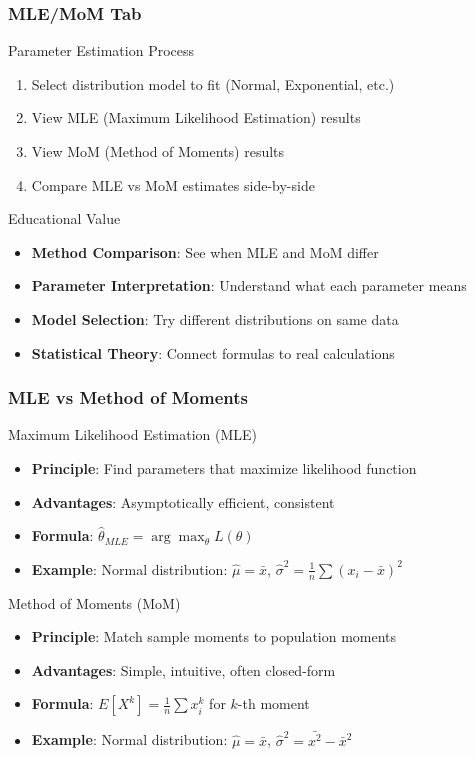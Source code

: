 \documentclass[aspectratio=169]{beamer}
\begin{document}
\begin{frame}
\frametitle{MLE/MoM Tab}
\begin{alertblock}{Parameter Estimation Process}
\begin{enumerate}
\item Select distribution model to fit (Normal, Exponential, etc.)
\item View MLE (Maximum Likelihood Estimation) results
\item View MoM (Method of Moments) results
\item Compare MLE vs MoM estimates side-by-side
\end{enumerate}
\end{alertblock}

\begin{exampleblock}{Educational Value}
\begin{itemize}
\item \textbf{Method Comparison}: See when MLE and MoM differ
\item \textbf{Parameter Interpretation}: Understand what each parameter means
\item \textbf{Model Selection}: Try different distributions on same data
\item \textbf{Statistical Theory}: Connect formulas to real calculations
\end{itemize}
\end{exampleblock}
\end{frame}

\begin{frame}
\frametitle{MLE vs Method of Moments}
\begin{alertblock}{Maximum Likelihood Estimation (MLE)}
\begin{itemize}
\item \textbf{Principle}: Find parameters that maximize likelihood function
\item \textbf{Advantages}: Asymptotically efficient, consistent
\item \textbf{Formula}: $\hat{\theta}_{MLE} = \arg\max_{\theta} L(\theta)$
\item \textbf{Example}: Normal distribution: $\hat{\mu} = \bar{x}$, $\hat{\sigma}^2 = \frac{1}{n}\sum(x_i - \bar{x})^2$
\end{itemize}
\end{alertblock}

\begin{alertblock}{Method of Moments (MoM)}
\begin{itemize}
\item \textbf{Principle}: Match sample moments to population moments
\item \textbf{Advantages}: Simple, intuitive, often closed-form
\item \textbf{Formula}: $E[X^k] = \frac{1}{n}\sum x_i^k$ for $k$-th moment
\item \textbf{Example}: Normal distribution: $\hat{\mu} = \bar{x}$, $\hat{\sigma}^2 = \bar{x^2} - \bar{x}^2$
\end{itemize}
\end{alertblock}
\end{frame}
\end{document}
